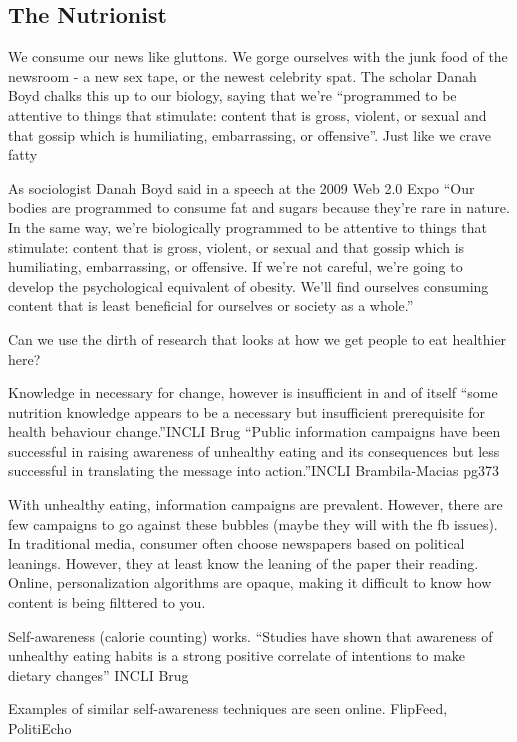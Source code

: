 \documentclass[]{article}
\begin{document}
\hypertarget{the-nutrionist}{%
\subsection{The Nutrionist}\label{the-nutrionist}}

We consume our news like gluttons. We gorge ourselves with the junk food
of the newsroom - a new sex tape, or the newest celebrity spat. The
scholar Danah Boyd chalks this up to our biology, saying that we're
``programmed to be attentive to things that stimulate: content that is
gross, violent, or sexual and that gossip which is humiliating,
embarrassing, or offensive''. Just like we crave fatty

As sociologist Danah Boyd said in a speech at the 2009 Web 2.0 Expo
``Our bodies are programmed to consume fat and sugars because they're
rare in nature. In the same way, we're biologically programmed to be
attentive to things that stimulate: content that is gross, violent, or
sexual and that gossip which is humiliating, embarrassing, or offensive.
If we're not careful, we're going to develop the psychological
equivalent of obesity. We'll find ourselves consuming content that is
least beneficial for ourselves or society as a whole.''

Can we use the dirth of research that looks at how we get people to eat
healthier here?

Knowledge in necessary for change, however is insufficient in and of
itself ``some nutrition knowledge appears to be a necessary but
insufficient prerequisite for health behaviour change.''INCLI Brug
``Public information campaigns have been successful in raising awareness
of unhealthy eating and its consequences but less successful in
translating the message into action.''INCLI Brambila-Macias pg373

With unhealthy eating, information campaigns are prevalent. However,
there are few campaigns to go against these bubbles (maybe they will
with the fb issues). In traditional media, consumer often choose
newspapers based on political leanings. However, they at least know the
leaning of the paper their reading. Online, personalization algorithms
are opaque, making it difficult to know how content is being filttered
to you.

Self-awareness (calorie counting) works. ``Studies have shown that
awareness of unhealthy eating habits is a strong positive correlate of
intentions to make dietary changes'' INCLI Brug

Examples of similar self-awareness techniques are seen online. FlipFeed,
PolitiEcho
\end{document}
